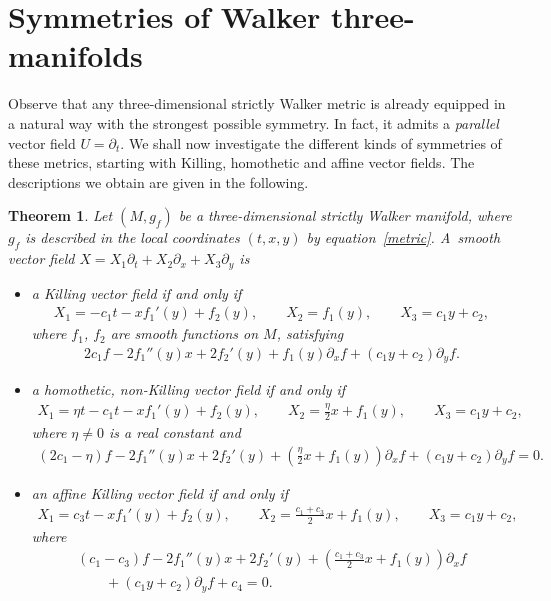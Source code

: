 \documentclass[pdftex]{sigma}
\numberwithin{equation}{section}
\newtheorem{Theorem}{Theorem}[section]
\begin{document}
\section{Symmetries of Walker three-manifolds}\label{section3}

Observe that any three-dimensional strictly Walker metric is already equipped in a natural way with the strongest possible symmetry. In fact, it admits a {\em parallel} vector f\/ield $U=\partial_t$. We shall now investigate the dif\/ferent kinds of symmetries of these metrics, starting with Killing, homothetic and af\/f\/ine vector f\/ields. The descriptions we obtain are given in the following.

\begin{Theorem}\label{nablasymm}
Let $(M,g_f)$ be a three-dimensional strictly Walker manifold, where $g_f$ is described in the local coordinates $(t,x,y)$ by equation~\eqref{metric}. A~smooth vector field $X=X_1\partial_t+X_2\partial_x+X_3\partial_y$ is
\begin{itemize}\itemsep=0pt
\item[$i)$] a Killing vector field if and only if
\begin{gather}\label{eqKillvector}
X_1=-c_1t-{xf_1 '(y)}+f_2(y),\qquad X_2=f_1(y),\qquad X_3=c_1y+c_2,
\end{gather}
where $f_1$, $f_2$ are smooth functions on $M$, satisfying
\begin{gather}\label{eqKill}
2c_1f-2f_1''(y)x+2f_2 '(y)+f_1(y)\partial_xf+(c_1y+c_2)\partial_yf.
\end{gather}

\item[$ii)$] a homothetic, non-Killing vector field if and only if
\begin{gather}\label{eqHomvector}
X_1=\eta t-c_1t- {xf_1 '(y)}+f_2(y),\qquad X_2=\frac\eta2 x+f_1(y),\qquad X_3=c_1y+c_2,
\end{gather}
where $\eta \neq 0$ is a real constant and
\begin{gather}\label{eqHom}
(2c_1-\eta)f-2f_1''(y)x+2f_2 '(y)+\left(\frac\eta2x+f_1(y)\right)\partial_xf+(c_1y+c_2)\partial_yf=0.
\end{gather}

\item[$iii)$] an affine Killing vector field if and only if
\begin{gather}\label{eqAffvector}
 X_1=c_3t-xf_1 '(y)+f_2(y),\qquad X_2=\frac{c_1+c_3}{2}x+f_1(y),\qquad X_3=c_1y+c_2,
\end{gather}
where
\begin{gather}
(c_1-c_3)f-2f_1 ''(y)x+2f_2 '(y)+\left(\frac{c_1+c_3}{2}x+f_1(y)\right)\partial_xf\nonumber\\
\qquad{} +(c_1y+c_2)\partial_yf+c_4=0.\label{eqAff}
\end{gather}
\end{itemize}
\end{Theorem}
\end{document}
